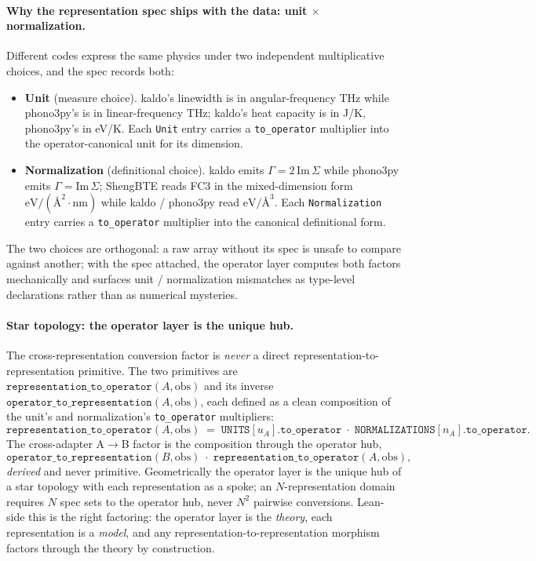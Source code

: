 \documentclass[11pt,a4paper]{article}
\begin{document}
\paragraph{Why the representation spec ships with the data: unit $\times$ normalization.}
Different codes express the same physics under two independent multiplicative
choices, and the spec records both:
\begin{itemize}[leftmargin=2em]
  \item \textbf{Unit} (measure choice). kaldo's linewidth is in angular-frequency
        THz while phono3py's is in linear-frequency THz; kaldo's heat capacity is
        in J/K, phono3py's in eV/K. Each \texttt{Unit} entry carries a
        \texttt{to\_operator} multiplier into the operator-canonical unit for
        its dimension.
  \item \textbf{Normalization} (definitional choice). kaldo emits $\Gamma = 2\,\text{Im}\,\Sigma$
        while phono3py emits $\Gamma = \text{Im}\,\Sigma$; ShengBTE reads FC3 in
        the mixed-dimension form $\text{eV}/(\text{\AA}^2 \cdot \text{nm})$ while
        kaldo / phono3py read $\text{eV}/\text{\AA}^3$. Each \texttt{Normalization}
        entry carries a \texttt{to\_operator} multiplier into the canonical
        definitional form.
\end{itemize}
The two choices are orthogonal: a raw array without its spec is unsafe to
compare against another; with the spec attached, the operator layer computes
both factors mechanically and surfaces unit / normalization mismatches as
type-level declarations rather than as numerical mysteries.

\paragraph{Star topology: the operator layer is the unique hub.}
The cross-representation conversion factor is \emph{never} a direct
representation-to-representation primitive. The two primitives are
$\texttt{representation\_to\_operator}(A,\text{obs})$ and its inverse
$\texttt{operator\_to\_representation}(A,\text{obs})$, each defined as a
clean composition of the unit's and normalization's
\texttt{to\_operator} multipliers:
\begin{equation*}
  \texttt{representation\_to\_operator}(A,\text{obs})
  \;=\; \texttt{UNITS}[u_A].\texttt{to\_operator}
  \;\cdot\; \texttt{NORMALIZATIONS}[n_A].\texttt{to\_operator}.
\end{equation*}
The cross-adapter A$\to$B factor is the composition through the operator hub,
\begin{equation*}
  \texttt{operator\_to\_representation}(B,\text{obs}) \;\cdot\;
  \texttt{representation\_to\_operator}(A,\text{obs}),
\end{equation*}
\emph{derived} and never primitive. Geometrically the operator layer is the
unique hub of a star topology with each representation as a spoke; an
$N$-representation domain requires $N$ spec sets to the operator hub, never
$N^2$ pairwise conversions. Lean-side this is the right factoring: the
operator layer is the \emph{theory}, each representation is a \emph{model},
and any representation-to-representation morphism factors through the theory
by construction.
\end{document}
